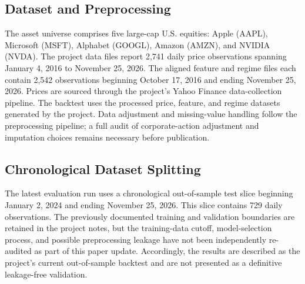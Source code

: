 \documentclass[conference]{IEEEtran}
\begin{document}
\subsection{Dataset and Preprocessing} The asset universe comprises five large-cap U.S. equities: Apple (AAPL), Microsoft (MSFT), Alphabet (GOOGL), Amazon (AMZN), and NVIDIA (NVDA). The project data files report 2,741 daily price observations spanning January 4, 2016 to November 25, 2026. The aligned feature and regime files each contain 2,542 observations beginning October 17, 2016 and ending November 25, 2026. Prices are sourced through the project's Yahoo Finance data-collection pipeline. The backtest uses the processed price, feature, and regime datasets generated by the project. Data adjustment and missing-value handling follow the preprocessing pipeline; a full audit of corporate-action adjustment and imputation choices remains necessary before publication.

\subsection{Chronological Dataset Splitting} The latest evaluation run uses a chronological out-of-sample test slice beginning January 2, 2024 and ending November 25, 2026. This slice contains 729 daily observations. The previously documented training and validation boundaries are retained in the project notes, but the training-data cutoff, model-selection process, and possible preprocessing leakage have not been independently re-audited as part of this paper update. Accordingly, the results are described as the project's current out-of-sample backtest and are not presented as a definitive leakage-free validation.
\end{document}
